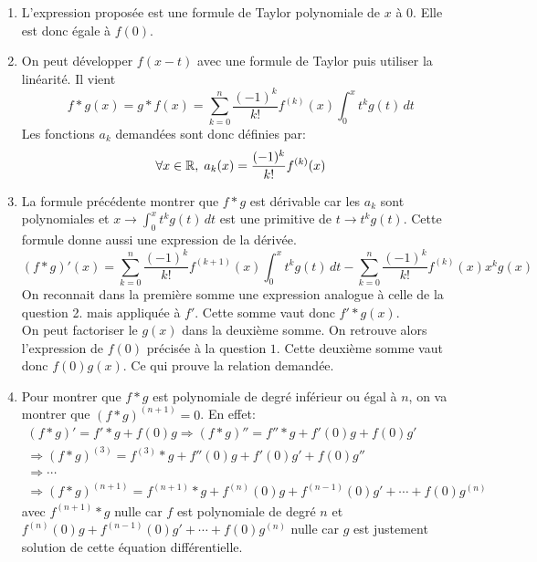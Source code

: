 \begin{enumerate}
 \item L'expression proposée est une formule de Taylor polynomiale de $x$ à $0$. Elle est donc égale à $f(0)$.
 \item On peut développer $f(x-t)$ avec une formule de Taylor puis utiliser la linéarité. Il vient
\begin{displaymath}
 f*g(x)=g*f(x) = \sum_{k=0}^n\frac{(-1)^k}{k!}f^{(k)}(x)\int_0^xt^kg(t)\,dt
\end{displaymath}
Les fonctions $a_k$ demandées sont donc définies par:
\begin{displaymath}
 \forall x\in \mathbb{R},\; a_k(x) = \frac{(-1)^k}{k!}f^{(k)}(x)
\end{displaymath}

 \item La formule précédente montrer que $f*g$ est dérivable car les $a_k$ sont polynomiales et $x\rightarrow\int_0^x t^kg(t)\,dt$ est une primitive de $t\rightarrow t^kg(t)$. Cette formule donne aussi une expression de la dérivée.
\begin{displaymath}
 (f*g)'(x) = \sum_{k=0}^n\frac{(-1)^k}{k!}f^{(k+1)}(x)\int_0^xt^kg(t)\,dt
- \sum_{k=0}^n\frac{(-1)^k}{k!}f^{(k)}(x)x^kg(x)
\end{displaymath}
On reconnait dans la première somme une expression analogue à celle de la question 2. mais appliquée à $f'$. Cette somme vaut donc $f'*g(x)$.\\
On peut factoriser le $g(x)$ dans la deuxième somme. On retrouve alors l'expression de $f(0)$ précisée à la question $1$. Cette deuxième somme vaut donc $f(0)g(x)$. Ce qui prouve la relation demandée.
 \item Pour montrer que $f*g$ est polynomiale de degré inférieur ou égal à $n$, on va montrer que $(f*g)^{(n+1)}=0$. En effet:
\begin{multline*}
 (f*g)' = f'*g +f(0)g
\Rightarrow (f*g)'' = f''*g +f'(0)g + f(0)g'\\
\Rightarrow (f*g)^{(3)} = f^{(3)}*g +f''(0)g + f'(0)g' +f(0)g''\\
\Rightarrow \cdots \\
\Rightarrow (f*g)^{(n+1)} = f^{(n+1)}*g +f^{(n)}(0)g + f^{(n-1)}(0)g'+\cdots +f(0)g^{(n)}
\end{multline*}
avec $f^{(n+1)}*g$ nulle car $f$ est polynomiale de degré $n$ et $f^{(n)}(0)g + f^{(n-1)}(0)g'+\cdots +f(0)g^{(n)}$ nulle car $g$ est justement solution de cette équation différentielle.
\end{enumerate}
